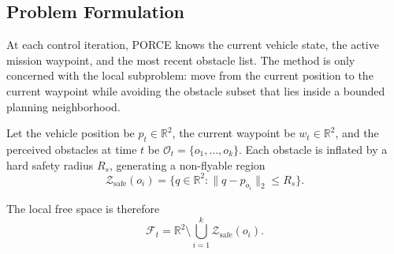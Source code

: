 \documentclass[journal,twoside,web]{ieeecolor}
\begin{document}

\subsection{Problem Formulation}

At each control iteration, PORCE knows the current vehicle state, the active mission waypoint, and the most recent obstacle list. The method is only concerned with the local subproblem: move from the current position to the current waypoint while avoiding the obstacle subset that lies inside a bounded planning neighborhood.

Let the vehicle position be \(p_t \in \mathbb{R}^2\), the current waypoint be \(w_t \in \mathbb{R}^2\), and the perceived obstacles at time \(t\) be \(\mathcal{O}_t = \{o_1,\dots,o_k\}\). Each obstacle is inflated by a hard safety radius \(R_s\), generating a non-flyable region
\begin{equation}
    \mathcal{Z}_{\mathrm{safe}}(o_i) = \{q \in \mathbb{R}^2 : \lVert q - p_{o_i} \rVert_2 \le R_s\}.
\end{equation}

The local free space is therefore
\begin{equation}
    \mathcal{F}_t = \mathbb{R}^2 \setminus \bigcup_{i=1}^{k} \mathcal{Z}_{\mathrm{safe}}(o_i).
\end{equation}
\end{document}
